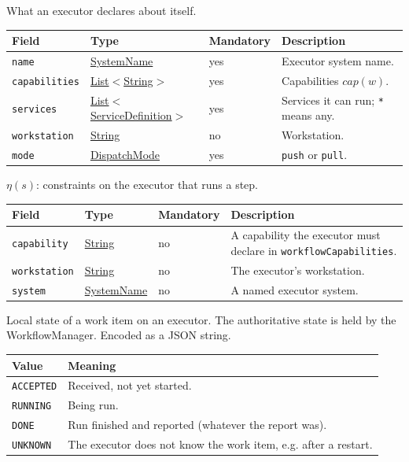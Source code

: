 \documentclass[a4paper]{arrowhead}
\newcommand{\mref}[1]{{\textcolor{ArrowheadPurple}{\hyperref[sec:model:#1]{#1}}}}
\newcommand{\pref}[1]{{\textcolor{ArrowheadGrey}{\hyperref[sec:model:primitives:#1]{#1}}}}
\begin{document}
What an executor declares about itself.

{\small
\begin{longtable}{|p{3.7cm}|p{4.2cm}|p{1.6cm}|p{6.3cm}|}

\hline
\rowcolor{gray!33} Field & Type & Mandatory & Description \\ \hline
\endhead
\texttt{name} & \pref{SystemName} & yes & Executor system name. \\ \hline
\texttt{capabilities} & \pref{List}$<$\pref{String}$>$ & yes & Capabilities $cap(w)$. \\ \hline
\texttt{services} & \pref{List}$<$\pref{ServiceDefinition}$>$ & yes & Services it can run; \texttt{*} means any. \\ \hline
\texttt{workstation} & \pref{String} & no & Workstation. \\ \hline
\texttt{mode} & \mref{DispatchMode} & yes & \texttt{push} or \texttt{pull}. \\ \hline
\end{longtable}
}

$\eta(s)$: constraints on the executor that runs a step.

{\small
\begin{longtable}{|p{3.7cm}|p{4.2cm}|p{1.6cm}|p{6.3cm}|}

\hline
\rowcolor{gray!33} Field & Type & Mandatory & Description \\ \hline
\endhead
\texttt{capability} & \pref{String} & no & A capability the executor must declare in \texttt{workflowCapabilities}. \\ \hline
\texttt{workstation} & \pref{String} & no & The executor's workstation. \\ \hline
\texttt{system} & \pref{SystemName} & no & A named executor system. \\ \hline
\end{longtable}
}

Local state of a work item on an executor. The authoritative state is held by the WorkflowManager.
 Encoded as a JSON string.
{\small
\begin{longtable}{|p{3.9cm}|p{11.9cm}|}

\hline
\rowcolor{gray!33} Value & Meaning \\ \hline
\endhead
\texttt{ACCEPTED} & Received, not yet started. \\ \hline
\texttt{RUNNING} & Being run. \\ \hline
\texttt{DONE} & Run finished and reported (whatever the report was). \\ \hline
\texttt{UNKNOWN} & The executor does not know the work item, e.g. after a restart. \\ \hline
\end{longtable}
}
\end{document}
